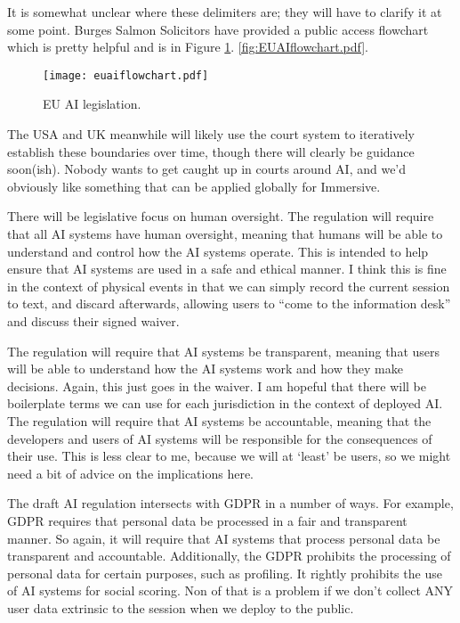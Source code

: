 It is somewhat unclear where these delimiters are; they will have to clarify it at some point. Burges Salmon Solicitors have provided a public access flowchart which is pretty helpful and is in Figure \ref{fig:euaiflowchart}.
\ref{fig:EUAIflowchart.pdf}. 
\begin{figure}[H]
    \centering
    \texttt{[image: euaiflowchart.pdf]}
    \caption{EU AI legislation.}
    \label{fig:euaiflowchart}
\end{figure}


The USA and UK meanwhile will likely use the court system to iteratively establish these boundaries over time, though there will clearly be guidance soon(ish). Nobody wants to get caught up in courts around AI, and we'd obviously like something that can be applied globally for Immersive.\par
There will be legislative focus on human oversight. The regulation will require that all AI systems have human oversight, meaning that humans will be able to understand and control how the AI systems operate. This is intended to help ensure that AI systems are used in a safe and ethical manner. I think this is fine in the context of physical events in that we can simply record the current session to text, and discard afterwards, allowing users to ``come to the information desk'' and discuss their signed waiver. \par 
The regulation will require that AI systems be transparent, meaning that users will be able to understand how the AI systems work and how they make decisions. Again, this just goes in the waiver. I am hopeful that there will be boilerplate terms we can use for each jurisdiction in the context of deployed AI. The regulation will require that AI systems be accountable, meaning that the developers and users of AI systems will be responsible for the consequences of their use. This is less clear to me, because we will at `least' be users, so we might need a bit of advice on the implications here.\par
The draft AI regulation intersects with GDPR in a number of ways. For example, GDPR requires that personal data be processed in a fair and transparent manner. So again, it will require that AI systems that process personal data be transparent and accountable. Additionally, the GDPR prohibits the processing of personal data for certain purposes, such as profiling. It rightly prohibits the use of AI systems for social scoring. Non of that is a problem if we don't collect ANY user data extrinsic to the session when we deploy to the public.\par
